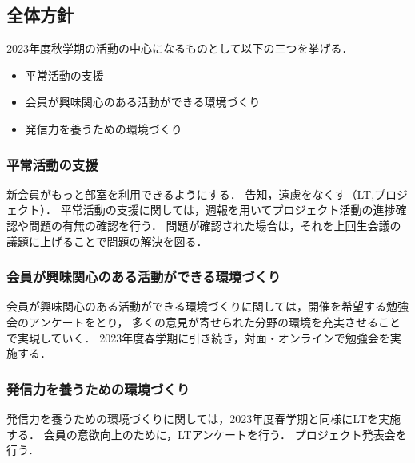 \subsection*{全体方針}

2023年度秋学期の活動の中心になるものとして以下の三つを挙げる．
\begin{itemize}
  \item 平常活動の支援
  \item 会員が興味関心のある活動ができる環境づくり
  \item 発信力を養うための環境づくり
\end{itemize}

\subsubsection*{平常活動の支援}
新会員がもっと部室を利用できるようにする．
告知，遠慮をなくす（LT,プロジェクト）．
平常活動の支援に関しては，週報を用いてプロジェクト活動の進捗確認や問題の有無の確認を行う．
問題が確認された場合は，それを上回生会議の議題に上げることで問題の解決を図る．

\subsubsection*{会員が興味関心のある活動ができる環境づくり}
会員が興味関心のある活動ができる環境づくりに関しては，開催を希望する勉強会のアンケートをとり，
多くの意見が寄せられた分野の環境を充実させることで実現していく．
2023年度春学期に引き続き，対面・オンラインで勉強会を実施する．

\subsubsection*{発信力を養うための環境づくり}
発信力を養うための環境づくりに関しては，2023年度春学期と同様にLTを実施する．
会員の意欲向上のために，LTアンケートを行う．
プロジェクト発表会を行う．
